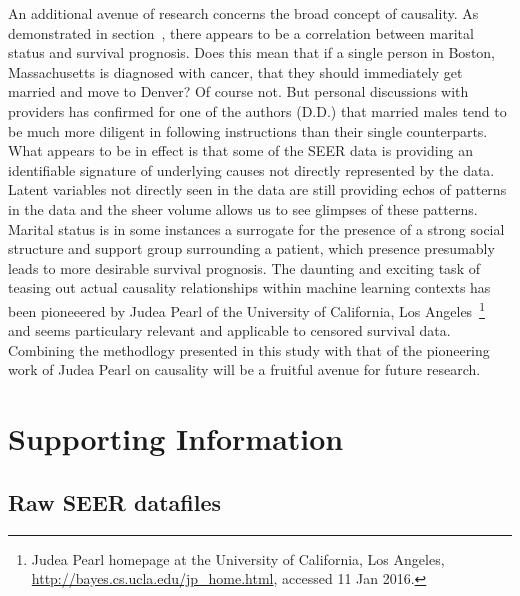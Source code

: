 \documentclass[10pt,letterpaper]{article}
\begin{document}
An additional avenue of research concerns the broad concept of causality. As demonstrated in section~, there appears to be a correlation between marital status and survival prognosis. Does this mean that if a single person in Boston, Massachusetts is diagnosed with cancer, that they should immediately get married and move to Denver? Of course not. 
But personal discussions with providers has confirmed for one of the authors (D.D.) that married males tend to be much more diligent in following instructions than their single counterparts. What appears to be in effect is that some of the SEER data is providing an identifiable signature of underlying causes not directly represented by the data. Latent variables not directly seen in the data are still providing echos of patterns in the data and the sheer volume allows us to see glimpses of these patterns. Marital status is in some instances a surrogate for the presence of a strong social structure and support group surrounding a patient, which presence presumably leads to more desirable survival prognosis. 
The daunting and exciting task of teasing out actual causality relationships within machine learning contexts has been pioneeered by Judea Pearl of the University of California, Los Angeles~\footnote{Judea Pearl homepage at the University of California, Los Angeles, \url{http://bayes.cs.ucla.edu/jp_home.html}, accessed 11 Jan 2016.} and seems particulary relevant and applicable to censored survival data. Combining the methodlogy presented in this study with that of the pioneering work of Judea Pearl on causality will be a fruitful avenue for future research.



\section*{Supporting Information}
\label{sec:supporting}





\subsection*{Raw SEER datafiles}
\label{sec:raw}
\end{document}
